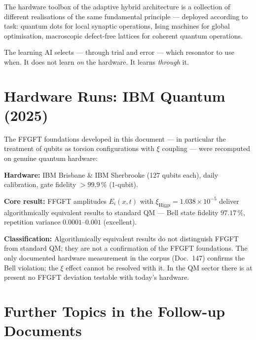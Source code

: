 \begin{significance}
The hardware toolbox of the adaptive hybrid architecture
is a collection of different realisations of the same
fundamental principle --- deployed according to task:
quantum dots for local synaptic operations,
Ising machines for global optimisation,
macroscopic defect-free lattices for coherent quantum operations.

The learning AI selects --- through trial and error ---
which resonator to use when.
It does not learn \textit{on} the hardware.
It learns \textit{through} it.
\end{significance}

\section{Hardware Runs: IBM Quantum (2025)}
\label{sec:ibm-validation}

\begin{keyresult}
The FFGFT foundations developed in this document ---
in particular the treatment of qubits as torsion configurations
with $\xi$ coupling --- were recomputed on genuine quantum hardware:

\textbf{Hardware:} IBM Brisbane \& IBM Sherbrooke (127 qubits each),
daily calibration, gate fidelity $> 99.9\,\%$ (1-qubit).

\textbf{Core result:}
FFGFT amplitudes $E_i(x,t)$ with $\xi_\text{Higgs} = 1.038 \times 10^{-5}$
deliver algorithmically equivalent results to standard QM ---
Bell state fidelity $97.17\,\%$, repetition variance
$0.0001$--$0.001$ (excellent).

\textbf{Classification:}
Algorithmically equivalent results do not distinguish FFGFT from
standard QM; they are not a confirmation of the FFGFT foundations.
The only documented hardware measurement in the corpus (Doc.~147)
confirms the Bell violation; the $\xi$ effect cannot be resolved with it.
In the QM sector there is at present no FFGFT deviation testable
with today's hardware.
\end{keyresult}

\section{Further Topics in the Follow-up Documents}
\label{sec:follow-up}

